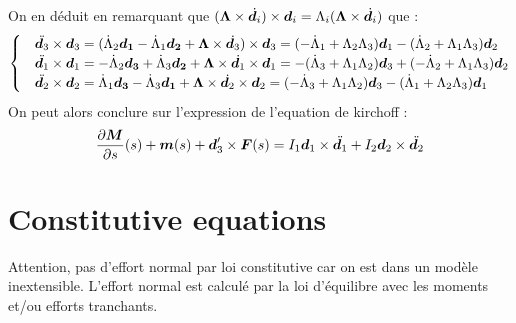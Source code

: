 On en déduit en remarquant que $(\boldsymbol{\Lambda}\times\dot{\boldsymbol{d}_i})\times\boldsymbol{d}_i = \Lambda_i(\boldsymbol{\Lambda}\times\dot{\boldsymbol{d}_i})$ que :
\begin{equation}
\begin{cases}
&\ddot{\boldsymbol{d}_3}\times\boldsymbol{d}_3 	
			= (\dot{\Lambda}_2\boldsymbol{d_1} - \dot{\Lambda}_1\boldsymbol{d_2} 
				+ \boldsymbol{\Lambda} \times \dot{\boldsymbol{d}_3}) \times \boldsymbol{d}_3
			= (- \dot{\Lambda}_1 + \Lambda_2\Lambda_3)\boldsymbol{d}_1
			-(\dot{\Lambda}_2 + \Lambda_1\Lambda_3)\boldsymbol{d}_2\\
&\ddot{\boldsymbol{d}_1}\times\boldsymbol{d}_1	
			= -\dot{\Lambda}_2\boldsymbol{d_3} + \dot{\Lambda}_3\boldsymbol{d_2}
				+ \boldsymbol{\Lambda} \times \dot{\boldsymbol{d}_1} \times \boldsymbol{d}_1
			= -(\dot{\Lambda}_3 + \Lambda_1\Lambda_2)\boldsymbol{d}_3
			+(-\dot{\Lambda}_2 + \Lambda_1\Lambda_3)\boldsymbol{d}_2\\
&\ddot{\boldsymbol{d}_2} \times\boldsymbol{d}_2	
			= \dot{\Lambda}_1\boldsymbol{d_3} - \dot{\Lambda}_3\boldsymbol{d_1}
				+ \boldsymbol{\Lambda} \times \dot{\boldsymbol{d}_2}  \times \boldsymbol{d}_2
			= (- \dot{\Lambda}_3 + \Lambda_1\Lambda_2)\boldsymbol{d}_3
			-(\dot{\Lambda}_1 + \Lambda_2\Lambda_3)\boldsymbol{d}_1\\		
\end{cases}
\end{equation}
On peut alors conclure sur l'expression de l'equation de kirchoff :
\begin{equation}
	\frac{\partial \boldsymbol{M}}{\partial s}(s)+\boldsymbol{m}(s) + \boldsymbol{d}_3'\times \boldsymbol{F}(s) = I_1\boldsymbol{d}_1 \times \ddot{\boldsymbol{d}_1} + I_2 \boldsymbol{d}_2 \times \ddot{\boldsymbol{d}_2}
\end{equation}

\section{Constitutive equations}

Attention, pas d'effort normal par loi constitutive car on est dans un modèle inextensible.
L'effort normal est calculé par la loi d'équilibre avec les moments et/ou efforts tranchants.

